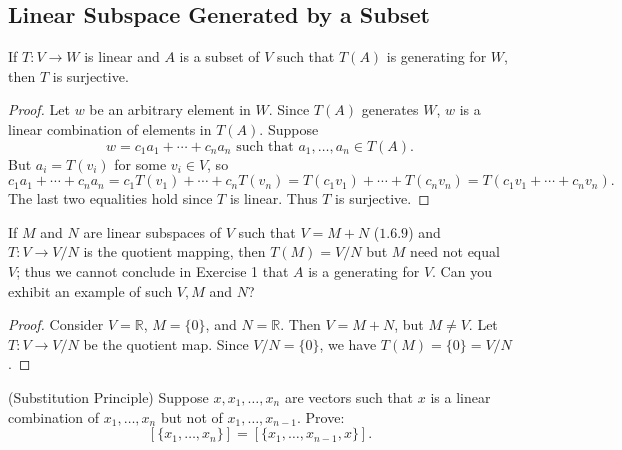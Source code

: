 \subsection{Linear Subspace Generated by a Subset}

\begin{tcolorbox}[title=Problem 1, breakable]
    If $T : V \longrightarrow W$ is linear and $A$
    is a subset of $V$ such that $T(A)$ is generating 
    for $W$, then $T$ is surjective.
\end{tcolorbox}

\begin{proof}
    Let $w$ be an arbitrary element in $W$.
    Since $T(A)$ generates $W$, $w$ is a linear combination of elements in $T(A)$.
    Suppose 
    \[
    w = c_1 a_1 + \cdots + c_n a_n \text{ such that } a_1, \ldots, a_n \in T(A).
    \]
    But $a_i = T(v_i)$ for some $v_i \in V$, so 
    \[
    c_1 a_1 + \cdots + c_n a_n = c_1 T(v_1) + \cdots + c_n T(v_n) = T(c_1 v_1) + \cdots + T(c_n v_n) = T(c_1 v_1 + \cdots + c_n v_n).
    \]
    The last two equalities hold since $T$ is linear.
    Thus $T$ is surjective.
\end{proof}

\begin{tcolorbox}[title=Problem 2, breakable]
    If $M$ and $N$ are linear subspaces of $V$ such that $V = M + N$ ($1.6.9$)
    and $T : V \longrightarrow V / N$ is the quotient mapping, then 
    $T(M) = V / N$ but $M$ need not equal $V$; thus we cannot conclude in 
    Exercise 1 that $A$ is a generating for $V$. Can you exhibit an example
    of such $V, M$ and $N$?
\end{tcolorbox}

\begin{proof}
    Consider $V = \mathbb{R}$, $M = \{0\}$, and $N = \mathbb{R}$. Then $V = M + N$, but $M \ne V$.
    Let $T : V \to V/N$ be the quotient map. Since $V/N = \{0\}$, we have $T(M) = \{0\} = V/N$.
\end{proof}

\begin{tcolorbox}[title=Problem 3, breakable]
    (Substitution Principle) Suppose $x, x_1, \ldots, x_n$ are 
    vectors such that $x$ is a linear combination of $x_1, \ldots, x_n$
    but not of $x_1, \ldots, x_{n - 1}$. Prove:
    \[[\{x_1, \ldots, x_n\}] = [\{x_1, \ldots, x_{n - 1}, x\}].\]
\end{tcolorbox}

